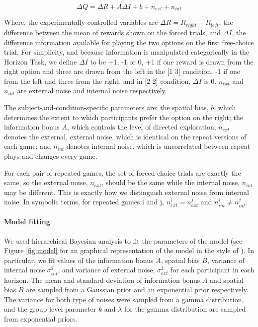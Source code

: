 \documentclass[12pt]{article}
\begin{document}
	\begin{equation}
	\Delta Q= \Delta R+A \Delta    I+b+n_{ext}+n_{int}
	\end{equation}
	
	Where, the experimentally controlled variables are $\Delta R=R_{right}-R_{left}$, the difference between the mean of rewards shown on the forced trials, and $\Delta I$, the difference information available for playing the two options on the first free-choice trial. For simplicity, and because information is manipulated categorically in the Horizon Task, we define $\Delta I$ to be +1, -1 or 0, +1 if one reward is drawn from the right option and three are drawn from the left in the [1 3] condition, -1 if one from the left and three from the right, and in [2 2] condition, $\Delta I$ is 0. $n_{ext}$ and $n_{int}$ are external noise and internal noise respectively.
	
	The subject-and-condition-specific parameters are: the spatial bias, $b$, which determines the extent to which participants prefer the option on the right; the information bonus $A$, which controls the level of directed exploration; $n_{ext}$ denotes the external, external noise, which is identical on the repeat versions of each game; and $n_{int}$ denotes internal noise, which is uncorrelated between repeat plays and changes every game.
	
	For each pair of repeated games, the set of forced-choice trials are exactly the same, so the external noise, $n_{ext}$, should be the same while the internal noise, $n_{int}$ may be different. This is exactly how we distinguish external noise from internal noise. In symbolic terms, for repeated games i and j,  $n_{ext}^i=n_{ext}^j$  and $n_{int}^i \neq n_{int}^j$.
	
	
	\paragraph{Model fitting}
	We used hierarchical Bayesian analysis to fit the parameters of the model (see Figure \ref{fig:model} for an graphical representation of the model in the style of \cite{lee2014}). In particular, we fit values of the information bonus $A$, spatial bias $B$, variance of internal noise $\sigma_{int}^2$, and variance of external noise, $\sigma_{ext}^2$ for each participant in each horizon. The mean and standard deviation of information bonus $A$ and spatial bias $B$ are sampled from a Gaussian prior and an exponential prior respectively. The variance for both type of noises were sampled from a gamma distribution, and the group-level parameter $k$ and $\lambda$ for the gamma distribution are sampled from exponential priors. 
	
\end{document}
